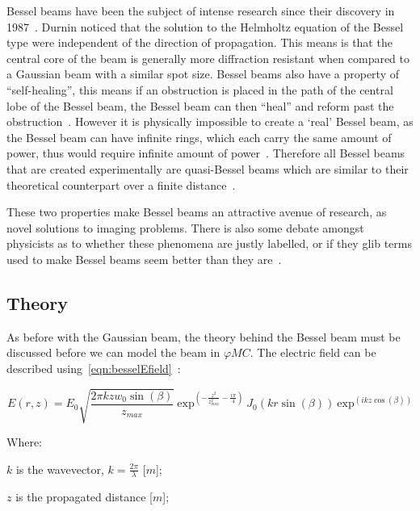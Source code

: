 Bessel beams have been the subject of intense research since their discovery in 1987~\cite{durnin1987diffraction,durnin1987exact}. 
Durnin noticed that the solution to the Helmholtz equation of the Bessel type were independent of the direction of propagation.
This means is that the central core of the beam is generally more diffraction resistant when compared to a Gaussian beam with a similar spot size.
Bessel beams also have a property of ``self-healing'', this means if an obstruction is placed in the path of the central lobe of the Bessel beam, the Bessel beam can then ``heal'' and reform past the obstruction~\cite{mcgloin2005bessel}.
However it is physically impossible to create a `real' Bessel beam, as the Bessel beam can have infinite rings, which each carry the same amount of power, thus would require infinite amount of power~\cite{durnin1987diffraction}.
Therefore all Bessel beams that are created experimentally are quasi-Bessel beams which are similar to their theoretical counterpart over a finite distance~\cite{durnin1987diffraction}.


These two properties make Bessel beams an attractive avenue of research, as novel solutions to imaging problems.
There is also some debate amongst physicists as to whether these phenomena are justly labelled, or if they glib terms used to make Bessel beams seem better than they are~\cite{debeer1987comment,harvey1984spot,durnin1987reply,sprangle1991comment,durnin1991durnin}.

\subsection{Theory}
As before with the Gaussian beam, the theory behind the Bessel beam must be discussed before we can model the beam in $\varphi MC$.
The electric field can be described using~\cref{eqn:besselEfield}~\cite{vcivzmar2006opticke}:

\begin{equation}
    E(r,z)=E_0\sqrt{\frac{2\pi k z w_0\sin(\beta)}{z_{max}}}\ \text{exp}^{\left(-\frac{z^2}{z_{max}^2}-\frac{i\pi}{4}\right)}\ J_0\left(kr\sin(\beta)\right)\ \text{exp}^{\left(ikz\cos(\beta)\right)}
    \label{eqn:besselEfield}
\end{equation}

\noindent Where:

    \indent $k$ is the wavevector, $k=\tfrac{2\pi}{\lambda}$ [$m$];

    \indent $z$ is the propagated distance [$m$]; 

